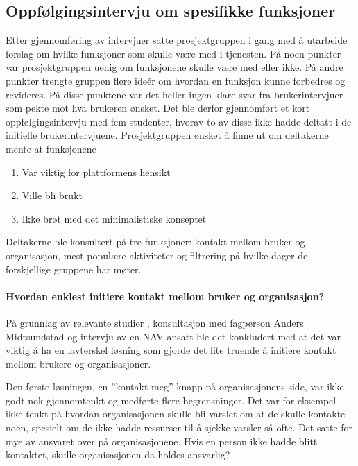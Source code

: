 \subsection{Oppfølgingsintervju om spesifikke funksjoner}
Etter gjennomføring av intervjuer satte prosjektgruppen i gang med å utarbeide forslag om hvilke funksjoner som skulle være med i tjenesten. På noen punkter var prosjektgruppen uenig om funksjonene skulle være med eller ikke. På andre punkter trengte gruppen flere ideér om hvordan en funksjon kunne forbedres og revideres. På disse punktene var det heller ingen klare svar fra brukerintervjuer som pekte mot hva brukeren ønsket. Det ble derfor gjennomført et kort oppfølgingsintervju med fem studenter, hvorav to av disse ikke hadde deltatt i de initielle brukerintervjuene. Prosjektgruppen ønsket å finne ut om deltakerne mente at funksjonene

\begin{enumerate}
\item Var viktig for plattformens hensikt
\item Ville bli brukt
\item Ikke brøt med det minimalistiske konseptet
\end{enumerate}

Deltakerne ble konsultert på tre funksjoner: kontakt mellom bruker og organisasjon, mest populære aktiviteter og filtrering på hvilke dager de forskjellige gruppene har møter.

\paragraph{Hvordan enklest initiere kontakt mellom bruker og organisasjon?} 
På grunnlag av relevante studier %
, konsultasjon med fagperson Anders Midtsundstad \cite{MIDTSUNDSTAD-INTERVJU:15} og intervju av en NAV-ansatt \cite{NAV-INTERVJU:16} ble det konkludert med at det var viktig å ha en lavterskel løsning som gjorde det lite truende å initiere kontakt mellom brukere og organisasjoner.

Den første løsningen, en ''kontakt meg''-knapp på organisasjonens side, var ikke godt nok gjennomtenkt og medførte flere begrensninger. Det var for eksempel ikke tenkt på hvordan organisasjonen skulle bli varslet om at de skulle kontakte noen, spesielt om de ikke hadde ressurser til å sjekke varsler så ofte. Det satte for mye av ansvaret over på organisasjonene. Hvis en person ikke hadde blitt kontaktet, skulle organisasjonen da holdes ansvarlig?

